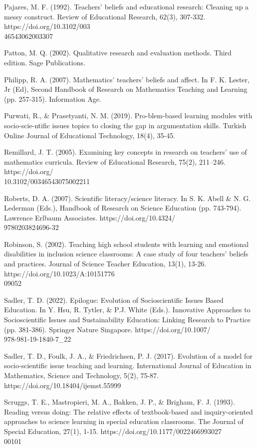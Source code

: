 \documentclass[11.5pt]{sig-alternate}
\begin{document}
\begin{large}
Pajares, M. F. (1992). Teachers’ beliefs and educational research: Cleaning up a messy construct. Review of Educational Research, 62(3), 307-332. https://doi.org/10.3102/003\\46543062003307

Patton, M. Q. (2002). Qualitative research and evaluation methods. Third edition. Sage Publications.

Philipp, R. A. (2007). Mathematics’ teachers’ beliefs and affect. In F. K. Lester, Jr (Ed), Second Handbook of Research on Mathematics Teaching and Learning (pp. 257-315). Information Age.

Purwati, R., \& Prasetyanti, N. M. (2019). Pro-blem-based learning modules with socio-scie-ntific issues topics to closing the gap in argumentation skills. Turkish Online Journal of Educational Technology, 18(4), 35-45.

Remillard, J. T. (2005). Examining key concepts in research on teachers’ use of mathematics curricula. Review of Educational Research, 75(2), 211–246. https://doi.org/\\10.3102/00346543075002211

Roberts, D. A. (2007). Scientific literacy/science literacy. In S. K. Abell \& N. G. Lederman (Eds.), Handbook of Research on Science Education (pp. 743-794). Lawrence Erlbaum Associates. https://doi.org/10.4324/\\9780203824696-32

Robinson, S. (2002). Teaching high school students with learning and emotional disabilities in inclusion science classrooms: A case study of four teachers' beliefs and practices. Journal of Science Teacher Education, 13(1), 13-26. https://doi.org/10.1023/A:10151776\\09052

Sadler, T. D. (2022). Epilogue: Evolution of Socioscientific Issues Based Education. In Y. Hsu, R. Tytler, \& P.J. White (Eds.). Innovative Approaches to Socioscientific Issues and Sustainability Education: Linking Research to Practice (pp. 381-386). Springer Nature Singapore. https://doi.org/10.1007/\\978-981-19-1840-7\_22

Sadler, T. D., Foulk, J. A., \& Friedrichsen, P. J. (2017). Evolution of a model for socio-scientific issue teaching and learning. International Journal of Education in Mathematics, Science and Technology, 5(2), 75-87. https://doi.org/10.18404/ijemst.55999

Scruggs, T. E., Mastropieri, M. A., Bakken, J. P., \& Brigham, F. J. (1993). Reading versus doing: The relative effects of textbook-based and inquiry-oriented approaches to science learning in special education classrooms. The Journal of Special Education, 27(1), 1-15. https://doi.org/10.1177/0022466993027\\00101


\end{large}
\end{document}
